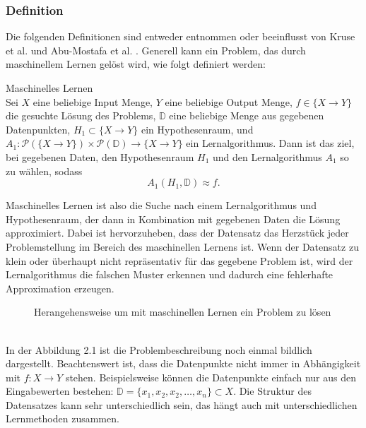 \documentclass[12pt,letterpaper,ngerman]{article}
\begin{document}
\subsubsection{Definition}
Die folgenden Definitionen sind entweder entnommen oder beeinflusst
von Kruse et al. \cite{Kruse2022} und Abu-Mostafa et al. \cite{LFD}.
Generell kann ein Problem, 
das durch maschinellem Lernen gelöst wird, wie folgt definiert werden:
\begin{definition}{Maschinelles Lernen}
  \\
  Sei $X$ eine beliebige Input Menge, $Y$ eine beliebige Output Menge,
  $f \in \{X \to Y\}$ die gesuchte Lösung des Problems, 
  $\mathbb{D}$ eine beliebige Menge aus gegebenen Datenpunkten,
  $H_1 \subset \{X \to Y\}$ ein Hypothesenraum, und 
  $A_1: \mathcal{P}(\{X \to Y\}) \times 
  \mathcal{P}(\mathbb{D}) \to \{ X \to Y \} $
  ein Lernalgorithmus. Dann ist das ziel, bei gegebenen Daten,
  den Hypothesenraum $H_1$ und den Lernalgorithmus $A_1$ so zu wählen,
  sodass
  \[
    A_1(H_1, \mathbb{D}) \approx f.
  \]
\end{definition}
Maschinelles Lernen ist also die Suche nach einem Lernalgorithmus 
und Hypothesenraum, der dann in Kombination mit gegebenen Daten die
Lösung approximiert. Dabei ist hervorzuheben, dass der Datensatz 
das Herzstück jeder Problemstellung im Bereich des maschinellen 
Lernens ist. Wenn der Datensatz zu klein oder überhaupt nicht 
repräsentativ für das gegebene Problem  ist, wird der 
Lernalgorithmus die falschen Muster erkennen und dadurch eine 
fehlerhafte Approximation erzeugen.
\begin{figure}[H]
  \begin{center}
    \caption{Herangehensweise um mit maschinellen Lernen ein Problem zu lösen}
  \end{center}
\end{figure}
\pagebreak
\hfill\\
In der Abbildung 2.1 ist die Problembeschreibung noch einmal bildlich dargestellt.
Beachtenswert ist, dass die Datenpunkte nicht immer in Abhängigkeit mit 
$f: X \to Y$ stehen. Beispielsweise können die Datenpunkte einfach nur aus den
Eingabewerten bestehen: $\mathbb{D} = \{x_1,x_2,x_2, \dots, x_n\} \subset X$.
Die Struktur des Datensatzes kann sehr unterschiedlich sein, das hängt auch mit 
unterschiedlichen Lernmethoden zusammen.
\end{document}
